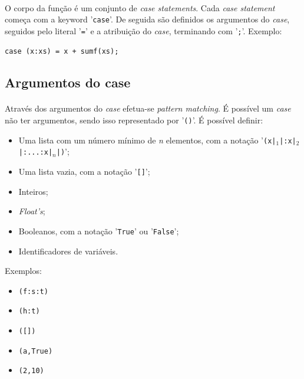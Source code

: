 \documentclass[11pt,a4paper]{report}
\begin{document}
\paragraph*{}
O corpo da função é um conjunto de \textit{case statements}. Cada \textit{case statement} começa com a keyword '\texttt{case}'. De seguida são definidos os argumentos do \textit{case}, seguidos pelo literal '\texttt{=}' e a atribuição do \textit{case}, terminando com '\texttt{;}'. Exemplo:

\begin{verbatim}
case (x:xs) = x + sumf(xs); 
\end{verbatim}

\subsection{Argumentos do case}
\paragraph*{}
Através dos argumentos do \textit{case} efetua-se \textit{pattern matching}. É possível um \textit{case} não ter argumentos, sendo isso representado por '\texttt{()}'. É possível definir:

\begin{itemize}
\item Uma lista com um número mínimo de \textit{n} elementos, com a notação '\texttt{(x|$_{1}$|:x|$_{2}$|:}\texttt{...}\texttt{:x|$_{n}$|)}';
    \item Uma lista vazia, com a notação '\texttt{[]}';
    \item Inteiros;
    \item \textit{Float's};
    \item Booleanos, com a notação '\texttt{True}' ou '\texttt{False}';
    \item Identificadores de variáveis.
\end{itemize}

Exemplos:
\begin{itemize}
    \item \texttt{(f:s:t)}
    \item \texttt{(h:t)}
    \item \texttt{([])}
    \item \texttt{(a,True)}
    \item \texttt{(2,10)}
\end{itemize}
\end{document}
